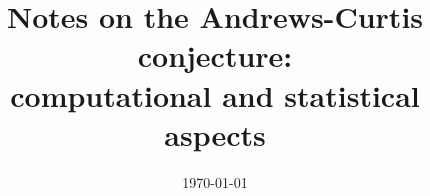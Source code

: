 \documentclass{amsart}
\title[Notes on the Andrews-Curtis conjecture]{Notes on the Andrews-Curtis conjecture: \\ computational and statistical aspects}
\date{\today}
\begin{document}
	
	\maketitle
	
	
	
	
	
	
	
	\appendix
	
	\sloppy
	\printbibliography
\end{document}
